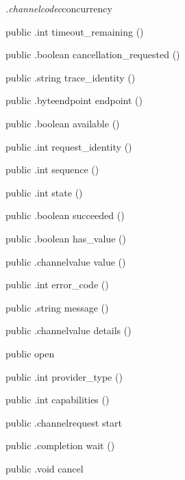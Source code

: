 \begin{CrexxClass}{\textit{.channelcodec}}{concurrency}
\begin{Members}
    \Method
      {public}
      {.int}
      {timeout\_remaining}
      {()}

    \Method
      {public}
      {.boolean}
      {cancellation\_requested}
      {()}

    \Method
      {public}
      {.string}
      {trace\_identity}
      {()}

    \Method
      {public}
      {.byteendpoint}
      {endpoint}
      {()}

    \Method
      {public}
      {.boolean}
      {available}
      {()}

    \Method
      {public}
      {.int}
      {request\_identity}
      {()}

    \Method
      {public}
      {.int}
      {sequence}
      {()}

    \Method
      {public}
      {.int}
      {state}
      {()}

    \Method
      {public}
      {.boolean}
      {succeeded}
      {()}

    \Method
      {public}
      {.boolean}
      {has\_value}
      {()}

    \Method
      {public}
      {.channelvalue}
      {value}
      {()}

    \Method
      {public}
      {.int}
      {error\_code}
      {()}

    \Method
      {public}
      {.string}
      {message}
      {()}

    \Method
      {public}
      {.channelvalue}
      {details}
      {()}

    \Factory
      {public}
      {open}
      {}

    \Method
      {public}
      {.int}
      {provider\_type}
      {()}

    \Method
      {public}
      {.int}
      {capabilities}
      {()}

    \Method
      {public}
      {.channelrequest}
      {start}
      {}

    \Method
      {public}
      {.completion}
      {wait}
      {()}

    \Method
      {public}
      {.void}
      {cancel}
      {}


\end{Members}
\end{CrexxClass}
